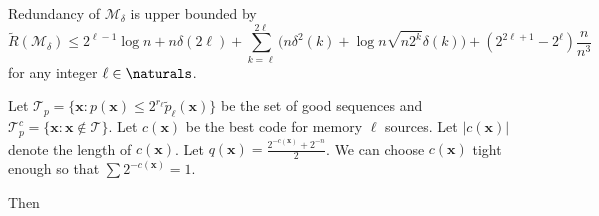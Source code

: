 \documentclass[conference,a4paper]{article}
\newcommand{\x}{\textbf{x}}
\newcommand{\w}{\textbf{w}}
\begin{document}
\eLemma

Redundancy of $\mathcal{M}_\delta$ is upper bounded by
\[
\tilde{R}(\mathcal{M}_\delta)
\leq 
	2^{\ell-1}\log n
+n\delta(2\ell)+\sum_{k=\ell}^{2\ell}\big(n\delta^2(k)+\log n\sqrt{n2^k}\delta(k)\big)
	+(2^{2\ell+1}-2^\ell)\frac{n}{n^3}
\]
for any integer $\ell\in\naturals$.

\Proof
Let $\mathcal{T}_p=\{\x:p(\x)\leq 2^{r_\ell}\tilde{p}_\ell(\x)\}$ be the set of good sequences and $\mathcal{T}_p^c=\{\x:\x\notin \mathcal{T}\}$.
Let $c(\x)$ be the best code for memory $\ell$ sources. Let $|c(\x)|$ denote the length of $c(\x)$. Let $q(\x)=\frac{2^{-c(\x)}+2^{-n}}{2}$. We can choose $c(\x)$ tight enough so that $\sum 2^{-c(\x)}=1$.


%


Then
\end{document}
